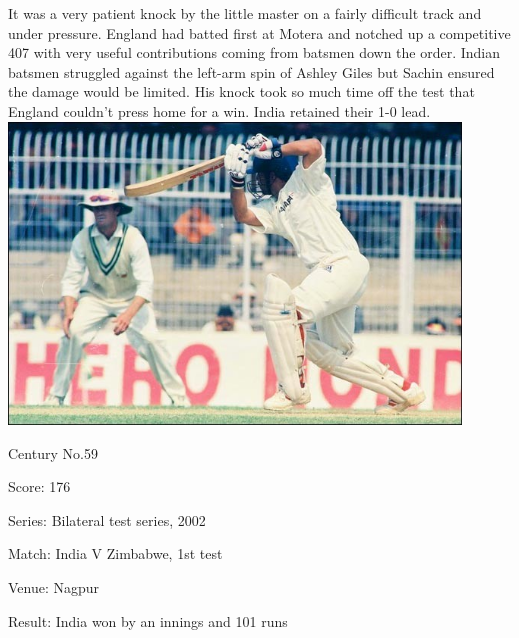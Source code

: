 \documentclass[11pt, a4paper]{article}
\begin{document}
It was a very patient knock by the little master on a fairly difficult track and under pressure. England had batted first at Motera and notched up a competitive 407 with very useful contributions coming from batsmen down the order. Indian batsmen struggled against the left-arm spin of Ashley Giles but Sachin ensured the damage would be limited. His knock took so much time off the test that England couldn't press home for a win. India retained their 1-0 lead.
\newpage
\includegraphics[width=0.9\textwidth]{pics/59.jpg}

Century No.59 

Score: 176 

Series: Bilateral test series, 2002 

Match: India V Zimbabwe, 1st test 

Venue: Nagpur 

Result: India won by an innings and 101 runs 
\end{document}
